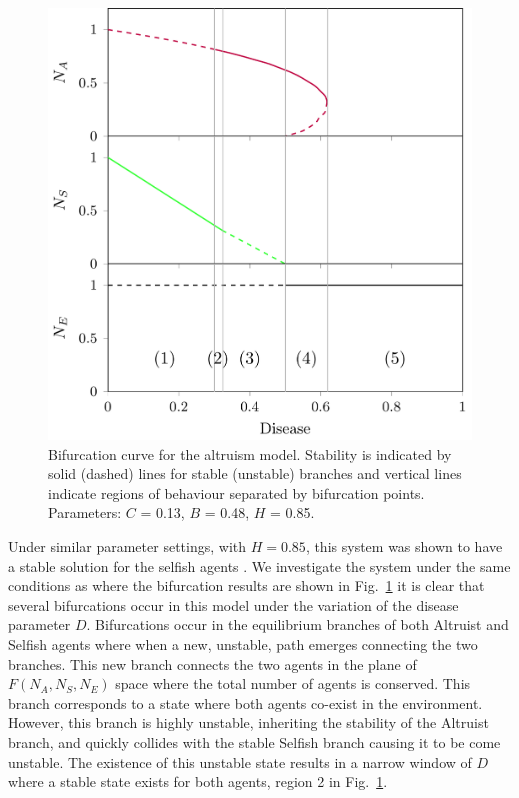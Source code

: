 \documentclass[11pt]{article}
\begin{document}
\begin{figure}[h]	
	\centering
	\includegraphics[width=0.8\linewidth]{AltruismD+H-D}	
	\caption{Bifurcation curve for the altruism model. Stability is 
	indicated by solid (dashed) lines for stable (unstable) branches 
	and vertical lines indicate regions of behaviour separated by bifurcation 
	points. Parameters: $C$ = 0.13, $B$ = 0.48, $H$ = 0.85.
	}
	\label{fig:altruistBifurcationD}
\end{figure}

Under similar parameter settings, with $H=0.85$, this system was shown to have a stable solution for the selfish agents \cite{Thomas2016ember}. We investigate the system under the same conditions as \cite{Thomas2016ember} where the bifurcation results are shown in Fig.~\ref{fig:altruistBifurcationD} it is clear that several bifurcations occur in this model under the variation of the disease parameter $D$. Bifurcations occur in the equilibrium branches of both Altruist and Selfish agents where when a new, unstable, path emerges connecting the two branches. This new branch connects the two agents in the plane of $F(N_A, N_S, N_E)$ space where the total number of agents is conserved. This branch corresponds to a state where both agents co-exist in the environment. However, this branch is highly unstable, inheriting the stability of the Altruist branch, and quickly collides with the stable Selfish branch causing it to be come unstable. The existence of this unstable state results in a narrow window of $D$ where a stable state exists for both agents, region 2 in Fig.~\ref{fig:altruistBifurcationD}. 
	
\end{document}
